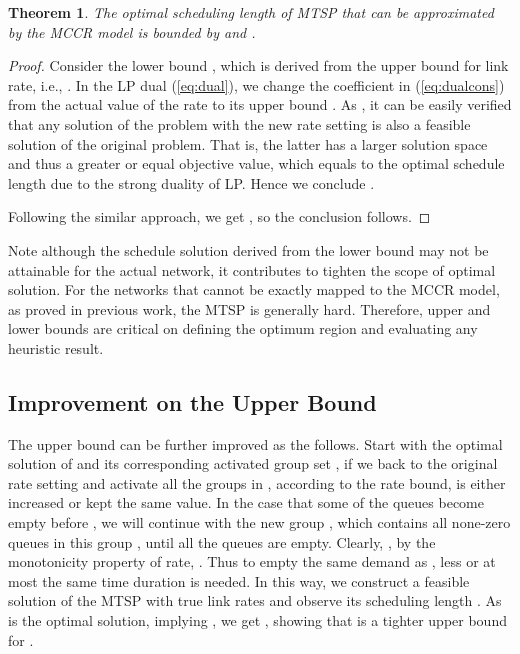 \documentclass[10pt,onecolumn,journal,draftcls,oneside]{IEEEtran}
\newtheorem{theorem}{Theorem}
\begin{document}
\begin{theorem}
\label{theo:bounds}
The optimal scheduling length of MTSP that can be approximated by the MCCR model is bounded by  and .
\end{theorem}

\begin{proof}
Consider the lower bound , which is derived from the upper bound for link rate, i.e., . In the LP dual (\ref{eq:dual}), we change the coefficient  in (\ref{eq:dualcons}) from the actual value of the rate to its upper bound . As , it can be easily verified that any solution of the problem with the new rate setting is also a feasible solution of the original problem. That is, the latter has a larger solution space and thus a greater or equal objective value, which equals to the optimal schedule length due to the strong duality of LP. Hence we conclude . 

Following the similar approach, we get , so the conclusion follows.
\end{proof}







Note although the schedule solution derived from the lower bound may not be attainable for the actual network, it contributes to tighten the scope of optimal solution.  For the networks that cannot be exactly mapped to the MCCR model, as proved in previous work, the MTSP is generally hard. Therefore, upper and lower bounds are critical on defining the optimum region and evaluating any heuristic result. 

\subsection{Improvement on the Upper Bound}
\label{sec:vd}

The upper bound  can be further improved as the follows. Start with the optimal solution of  and its corresponding activated group set , if we back to the original rate setting and activate all the groups in , according to the rate bound,  is either increased or kept the same value. In the case that some of the queues become empty before , we will continue with the new group , which contains all none-zero queues in this group , until all the queues are empty. Clearly, , by the monotonicity property of rate, . Thus to empty the same demand as , less or at most the same time duration is needed. In this way, we construct a feasible solution of the MTSP with true link rates and observe its scheduling length . As  is the optimal solution, implying , we get , showing that  is a tighter upper bound for .
\end{document}
